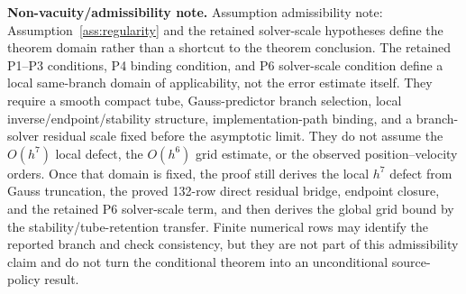 \documentclass[preprint,12pt]{elsarticle}
\begin{document}
\noindent\textbf{Non-vacuity/admissibility note.}
Assumption admissibility note: Assumption~\ref{ass:regularity} and the
retained solver-scale hypotheses define the theorem domain rather than a
shortcut to the theorem conclusion.
The retained
P1--P3 conditions, P4 binding condition, and P6 solver-scale condition define
a local same-branch domain of applicability, not the error estimate itself.
They require a smooth compact tube,
Gauss-predictor branch selection, local inverse/endpoint/stability structure,
implementation-path binding, and a branch-solver residual scale fixed before
the asymptotic limit. They do not assume the \(O(h^7)\) local defect, the
\(O(h^6)\) grid estimate, or the observed position--velocity orders. Once
that domain is fixed, the proof still derives the local \(h^7\) defect from
Gauss truncation, the proved 132-row direct residual bridge, endpoint
closure, and the retained P6 solver-scale term, and then derives the global
grid bound by the stability/tube-retention transfer. Finite numerical rows may
identify the reported branch and check consistency, but they are not part of
this admissibility claim and do not turn the conditional theorem into an
unconditional source-policy result.
\end{document}
